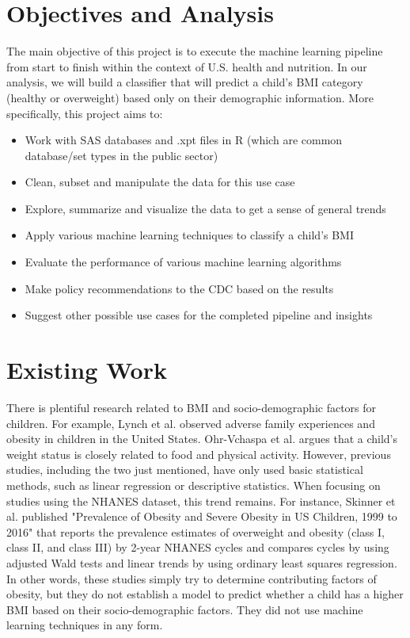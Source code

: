 \documentclass[twoside,11pt]{article}
\begin{document}
\section{Objectives and Analysis}
The main objective of this project is to execute the machine learning pipeline from start to finish within the context of U.S. health and nutrition. In our analysis, we will build a classifier that will predict a child's BMI category (healthy or overweight) based only on their demographic information. More specifically, this project aims to:
\begin{itemize}[noitemsep,topsep=0pt]
\item Work with SAS databases and .xpt files in R (which are common database/set types in the public sector)
\item Clean, subset and manipulate the data for this use case
\item Explore, summarize and visualize the data to get a sense of general trends
\item Apply various machine learning techniques to classify a child's BMI
\item Evaluate the performance of various machine learning algorithms
\item Make policy recommendations to the CDC based on the results
\item Suggest other possible use cases for the completed pipeline and insights
\end{itemize}

\section{Existing Work}
There is plentiful research related to BMI and socio-demographic factors for children. For example, Lynch et al. observed adverse family experiences and obesity in children in the United States. Ohr-Vchaspa et al. argues that a child's weight status is closely related to food and physical activity. However, previous studies, including the two just mentioned, have only used basic statistical methods, such as linear regression or descriptive statistics. When focusing on studies using the NHANES dataset, this trend remains. For instance, Skinner et al. published "Prevalence of Obesity and Severe Obesity in US Children, 1999 to 2016" that reports the prevalence estimates of overweight and obesity (class I, class II, and class III) by 2-year NHANES cycles and compares cycles by using adjusted Wald tests and linear trends by using ordinary least squares regression. In other words, these studies simply try to determine contributing factors of obesity, but they do not establish a model to predict whether a child has a higher BMI based on their socio-demographic factors. They did not use machine learning techniques in any form. 
\end{document}
